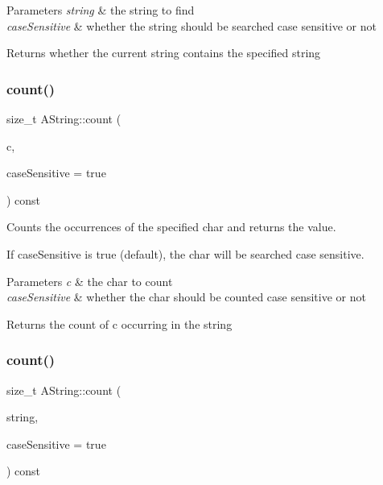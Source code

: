 \begin{DoxyParams}{Parameters}
{\em string} & the string to find \\
\hline
{\em case\+Sensitive} & whether the string should be searched case sensitive or not \\
\hline
\end{DoxyParams}
\begin{DoxyReturn}{Returns}
whether the current string contains the specified string 
\end{DoxyReturn}
\mbox{\label{class_a_string_aec69f5126101c65f03723a7969d5cccd}} 
\subsubsection{\texorpdfstring{count()}{count()}\hspace{0.1cm}{\footnotesize\ttfamily [1/2]}}
{\footnotesize\ttfamily size\+\_\+t A\+String\+::count (\begin{DoxyParamCaption}\item[{char}]{c,  }\item[{bool}]{case\+Sensitive = {\ttfamily true} }\end{DoxyParamCaption}) const}



Counts the occurrences of the specified char and returns the value. 

If case\+Sensitive is true (default), the char will be searched case sensitive.


\begin{DoxyParams}{Parameters}
{\em c} & the char to count \\
\hline
{\em case\+Sensitive} & whether the char should be counted case sensitive or not \\
\hline
\end{DoxyParams}
\begin{DoxyReturn}{Returns}
the count of c occurring in the string 
\end{DoxyReturn}
\mbox{\label{class_a_string_a24d7963315d80af76af246970f8c19dd}} 
\subsubsection{\texorpdfstring{count()}{count()}\hspace{0.1cm}{\footnotesize\ttfamily [2/2]}}
{\footnotesize\ttfamily size\+\_\+t A\+String\+::count (\begin{DoxyParamCaption}\item[{const \mbox{\hyperlink{class_a_string}{A\+String}} \&}]{string,  }\item[{bool}]{case\+Sensitive = {\ttfamily true} }\end{DoxyParamCaption}) const}



